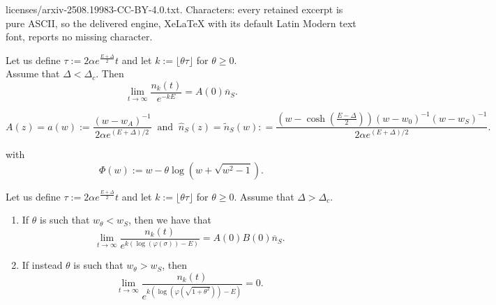 \documentclass[10pt,a4paper]{amsart}
\begin{document}
licenses/arxiv-2508.19983-CC-BY-4.0.txt. Characters: every retained excerpt is pure ASCII, so the delivered engine, XeLaTeX with its default Latin Modern text font, reports no missing character.
\begin{theorem} \label{theo:half line asymptotics delta subcrit}
Let us define $\tau:= 2 \alpha e^{\frac{E+ \Delta }{2}} t$ and let $k:=\lfloor \theta \tau \rfloor$ for  $\theta \geq 0$.
\\  Assume that $\Delta < \Delta_c $. 
Then 
    \begin{equation} \label{asympt half subc}
    \lim_{t \to \infty } \frac{ n_{k} (t) }{ e^{-k E} } = A(0) \overline n_S.
    \end{equation}
\end{theorem}

\begin{equation} \label{a}
A(z)=a(w):= \frac{(w-w_A)^{-1}}{ 2 \alpha e^{(E+\Delta)/2 } }  \ \text{ and }  \ \hat{n}_S(z)= \tilde{n}_S (w): = \frac{\left(w- \cosh\left( \frac{E- \Delta }{2} \right) \right) (w-w_0)^{-1} (w-w_S)^{-1}}{2\alpha e^{(E+\Delta )/2 }} . 
\end{equation}

with \begin{equation} \label{Phi}
\Phi(w):= w - \theta  \log(w + \sqrt{w^2-1}). 
\end{equation}

\begin{theorem} \label{theo:half line asymptotics delta supercrit}
Let us define $\tau:= 2 \alpha e^{\frac{E+ \Delta }{2}} t$ and let $k:=\lfloor \theta \tau \rfloor$ for  $\theta \geq 0$.
    Assume that $\Delta > \Delta_c $. 
    \begin{enumerate} 
\item If $\theta $ is such that $w_\theta < w_S $, then we have that  
     \begin{equation}\label{asympt half superc thetha small}
    \lim_{t \to \infty } \frac{ n_{k} (t) }{ e^{k( \log(\varphi(\sigma))- E ) } } = A(0) B(0) \overline n_S  .
    \end{equation}
 \item    If instead $\theta $ is such that  $w_\theta  >w_S  $, then 
     \begin{equation}\label{asympt half superc thetha large}
    \lim_{t \to \infty } \frac{ n_{k} (t) }{ e^{k( \log(\varphi(\sqrt{1+\theta^2 }))- E ) } } = 0.
    \end{equation}
    \end{enumerate}
\end{theorem}
\end{document}
